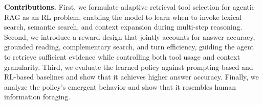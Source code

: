 \documentclass[11pt]{article}
\newcommand{\vn}[1]{\textcolor{blue}{\bf [varun: #1]}}
\begin{document}
\textbf{Contributions.} First, we formulate adaptive retrieval tool selection for agentic RAG as an RL problem, enabling the model to learn when to invoke lexical search, semantic search, and context expansion during multi-step reasoning. Second, we introduce a reward design that jointly accounts for  answer accuracy, grounded reading, complementary search, and turn efficiency, guiding the agent to retrieve sufficient evidence while controlling both tool usage and context granularity. Third, we evaluate the learned policy against prompting-based and RL-based baselines and show that it achieves higher answer accuracy. Finally, we analyze the policy’s emergent behavior and show that it resembles human information foraging.





\end{document}
